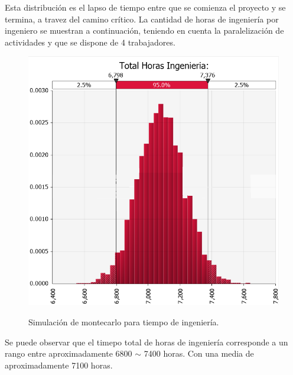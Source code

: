 Esta distribución es el lapso de tiempo entre que se comienza el proyecto y se termina, a travez del camino crítico. 
La cantidad de horas de ingeniería por ingeniero se muestran a continuación, teniendo en cuenta la paralelización de actividades y que se dispone de 4 trabajadores.
\begin{figure}[H]
	\centering
	\includegraphics[width=0.5\linewidth]{ImagenesFactibilidad/montecarlo_tiempo_largo}
	\label{fig:montecarlo_tiempos_ing}
	\caption{Simulación de montecarlo para tiempo de ingeniería.}
\end{figure}
Se puede observar que el timepo total de horas de ingeniería corresponde a un rango entre aproximadamente 6800 $\sim$ 7400 horas.
Con una media de aproximadamente 7100 horas.